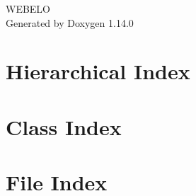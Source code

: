\documentclass[twoside]{book}
\newcommand{\+}{\discretionary{\mbox{\scriptsize$\hookleftarrow$}}{}{}}
\newcommand{\clearemptydoublepage}{%
    \newpage{\pagestyle{empty}\cleardoublepage}%
  }
\begin{document}
  \raggedbottom
    \hypersetup{pageanchor=false,
                bookmarksnumbered=true,
                pdfencoding=unicode
               }
  \begin{titlepage}
  \vspace*{7cm}
  \begin{center}%
  {\Large WEBELO}\\
  \vspace*{1cm}
  {\large Generated by Doxygen 1.14.0}\\
  \end{center}
  \end{titlepage}
  \clearemptydoublepage
  \tableofcontents
  \clearemptydoublepage
  \hypersetup{pageanchor=true}




\chapter{Hierarchical Index}

\chapter{Class Index}

\chapter{File Index}

\end{document}
